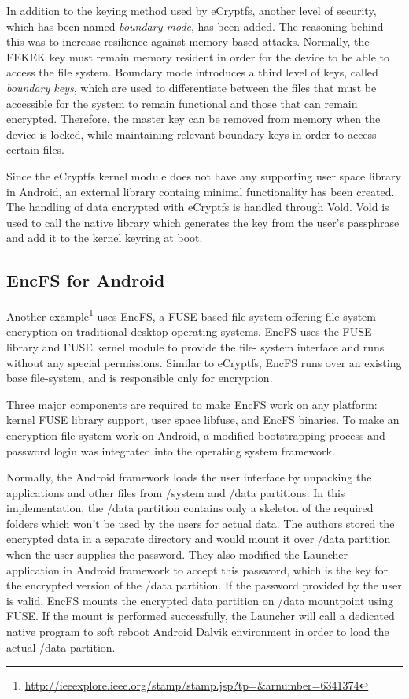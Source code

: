 In addition to the keying method used by eCryptfs, another level of security, which has been named \textit{boundary mode}, has been added. The reasoning behind this was to increase resilience against memory-based attacks. Normally, the FEKEK key must remain memory resident in order for the device to be able to access the file system. Boundary mode introduces a third level of keys, called \textit{boundary keys}, which are used to differentiate between the files that must be accessible for the system to remain functional and those that can remain encrypted. Therefore, the master key can be removed from memory when the device is locked, while maintaining relevant boundary keys in order to access certain files.

Since the eCryptfs kernel module does not have any supporting user space library in Android, an external library containg minimal functionality has been created. The handling of data encrypted with eCryptfs is handled through Vold. Vold is used to call the native library which generates the key from the user's passphrase and add it to the kernel keyring at boot.

\subsection{EncFS for Android}
\label{sub-sec:encfs}

Another example\footnote{\url{http://ieeexplore.ieee.org/stamp/stamp.jsp?tp=&arnumber=6341374}} uses EncFS, a FUSE-based file-system offering file-system encryption on traditional desktop operating systems. EncFS uses the FUSE library and FUSE kernel module to provide the file- system interface and runs without any special permissions. Similar to eCryptfs, EncFS runs over an existing base file-system, and is responsible only for encryption.

Three major components are required to make EncFS work on any platform: kernel FUSE library support, user space libfuse, and EncFS binaries. To make an encryption file-system work on Android, a modified bootstrapping process and password login was integrated into the operating system framework.

Normally, the Android framework loads the user interface by unpacking the applications and other files from /system and /data partitions. In this implementation, the /data partition contains only a skeleton of the required folders which won’t be used by the users for actual data. The authors stored the encrypted data in a separate directory and would mount it over /data partition when the user supplies the password.
They also modified the Launcher application in Android framework to accept this password, which is the key for the encrypted version of the /data partition. If the password provided by the user is valid, EncFS mounts the encrypted data partition on /data mountpoint using FUSE. If the mount is performed successfully, the Launcher will call a dedicated native program to soft reboot Android Dalvik environment in order to load the actual /data partition.